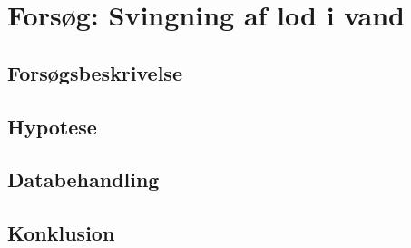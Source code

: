 \section{Forsøg: Svingning af lod i vand}

\subsection{Forsøgsbeskrivelse}

\subsection{Hypotese}

\subsection{Databehandling}

\subsection{Konklusion}


